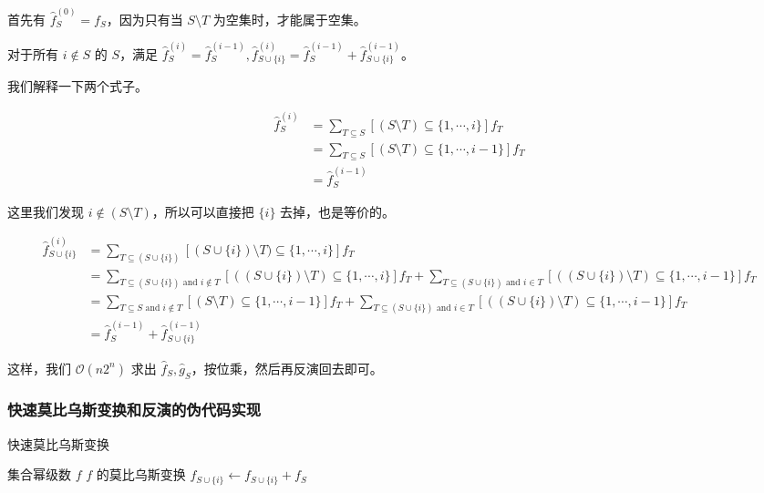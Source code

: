\documentclass{article}
\begin{document}
首先有 $\hat f_S^{(0)}=f_S$，因为只有当 $S \setminus T$ 为空集时，才能属于空集。

对于所有 $i\notin S$ 的 $S$，满足 $\hat f_S^{(i)}=\hat f_S^{(i-1)},\hat f_{S\cup\{i\}}^{(i)}=\hat f_S^{(i-1)}+\hat f_{S\cup\{i\}}^{(i-1)}$。

我们解释一下两个式子。

$$\begin{aligned}
\hat f_S^{(i)} &= \sum_{T \subseteq S}[(S \setminus T)\subseteq\{1,\cdots,i\}]f_T\\
               &= \sum_{T \subseteq S}[(S \setminus T)\subseteq\{1,\cdots,i-1\}]f_T\\
               &= \hat f_S^{(i-1)}
\end{aligned}$$

这里我们发现 $i \notin (S \setminus T)$，所以可以直接把 $\{i\}$ 去掉，也是等价的。

$$
\begin{aligned}
\hat f_{S\cup\{i\}}^{(i)} &= \sum_{T \subseteq (S\cup\{i\})}[(S\cup\{i\}) \setminus T)\subseteq\{1,\cdots,i\}]f_T\\
               &= \sum_{T \subseteq (S\cup\{i\}) \text{ and } i \notin T}[((S\cup\{i\}) \setminus T)\subseteq\{1,\cdots,i\}]f_T+\sum_{T \subseteq (S\cup\{i\}) \text{ and } i \in T}[((S\cup\{i\}) \setminus T)\subseteq\{1,\cdots,i-1\}]f_T\\
               &= \sum_{T \subseteq S \text{ and } i \notin T}[(S \setminus T)\subseteq\{1,\cdots,i-1\}]f_T+\sum_{T \subseteq (S\cup\{i\}) \text{ and } i \in T}[((S\cup\{i\}) \setminus T)\subseteq\{1,\cdots,i-1\}]f_T\\
               &= \hat f_S^{(i-1)}+\hat f_{S \cup \{i\}}^{(i-1)}
\end{aligned}
$$

这样，我们 $\mathcal{O}(n2^n)$ 求出 $\hat f_S,\hat g_S$，按位乘，然后再反演回去即可。


\subsubsection*{快速莫比乌斯变换和反演的伪代码实现}

\begin{algorithm}
	\caption{快速莫比乌斯变换}
	\begin{algorithmic}[1]
		\Require 集合幂级数 $f$
		\Ensure $f$ 的莫比乌斯变换
					\State $f_{S \cup \{i\}} \gets f_{S \cup \{i\}} + f_{S}$
				\EndFor
			\EndFor
			\State {}
		\EndFunction
	\end{algorithmic}
\end{algorithm}
\end{document}
